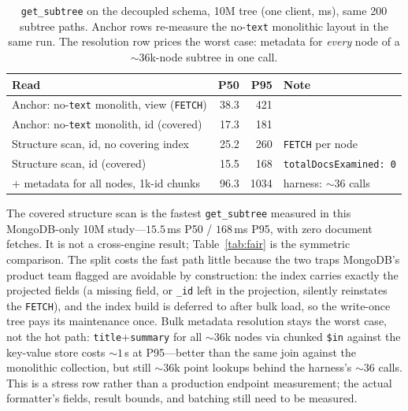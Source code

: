 \documentclass[11pt]{article}
\newcommand{\code}[1]{\texttt{#1}}
\newcommand{\hdr}{\rowcolor{hdrgray}}
\newcommand{\key}{\rowcolor{keyrow}}
\newenvironment{ctab}{\par\medskip\centering\small
  \setlength{\tabcolsep}{5pt}\renewcommand{\arraystretch}{1.12}}{\par\medskip}
\begin{document}
\begin{table}[h]
\caption{\code{get\_subtree} on the decoupled schema, 10M tree (one client, ms),
same 200 subtree paths. Anchor rows re-measure the no-\code{text} monolithic
layout in the same run. The resolution row prices the worst case: metadata for
\emph{every} node of a ${\sim}36$k-node subtree in one call.}
\label{tab:kv}
\begin{ctab}
\begin{tabular}{@{}p{7.0cm}rrl@{}}
\toprule
\hdr Read & P50 & P95 & Note \\
\midrule
Anchor: no-\code{text} monolith, view (\code{FETCH}) & 38.3 & 421 & \\
Anchor: no-\code{text} monolith, id (covered) & 17.3 & 181 & \\
Structure scan, id, no covering index & 25.2 & 260 & \code{FETCH} per node \\
\key Structure scan, id (covered) & 15.5 & 168 & \code{totalDocsExamined:\,0} \\
${+}$ metadata for all nodes, 1k-id chunks & 96.3 & 1034 & harness: ${\sim}36$ calls \\
\bottomrule
\end{tabular}
\end{ctab}
\end{table}

The covered structure scan is the fastest \code{get\_subtree} measured in this
MongoDB-only 10M study---$15.5$\,ms P50 / $168$\,ms P95, with zero document
fetches. It is not a cross-engine result; Table~\ref{tab:fair} is the symmetric
comparison. The split costs the fast path little because the two traps MongoDB's
product team flagged are avoidable by
construction: the index carries exactly the projected fields (a missing field,
or \code{\_id} left in the projection, silently reinstates the \code{FETCH}),
and the index build is deferred to after bulk load, so the write-once tree pays
its maintenance once. Bulk metadata resolution stays the worst case, not the hot
path: \code{title}+\code{summary} for all ${\sim}36$k nodes via chunked
\code{\$in} against the key-value store costs ${\sim}1$\,s at P95---better than
the same join against the monolithic collection, but still ${\sim}36$k point
lookups behind the harness's ${\sim}36$ calls. This is a stress row rather than a
production endpoint measurement; the actual formatter's fields, result bounds,
and batching still need to be measured.
\end{document}
